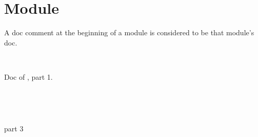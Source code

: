 \section{Module }\label{container-page-test-module-Toplevel+u+comments}%
A doc comment at the beginning of a module is considered to be that module's doc.

\label{container-page-test-module-Toplevel+u+comments-module-type-T}\begin{ocamlindent}\label{container-page-test-module-Toplevel+u+comments-module-type-T-type-t}\\
\end{ocamlindent}%
\begin{ocamlindent}Doc of , part 1.\end{ocamlindent}%
\medbreak
\label{container-page-test-module-Toplevel+u+comments-module-Include+u+inline}\begin{ocamlindent} \hyperref[container-page-test-module-Toplevel+u+comments-module-type-T]{}\label{container-page-test-module-Toplevel+u+comments-module-Include+u+inline-type-t}\\
\end{ocamlindent}%
\\
\label{container-page-test-module-Toplevel+u+comments-module-Include+u+inline'}\begin{ocamlindent}part 3 \hyperref[container-page-test-module-Toplevel+u+comments-module-type-T]{}\label{container-page-test-module-Toplevel+u+comments-module-Include+u+inline'-type-t}\\
\end{ocamlindent}%
